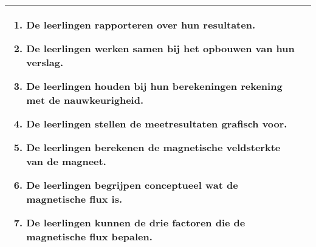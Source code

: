 \begin{landscape}
\begin{tabularx}{1.56\textwidth}{|p{}|X|}
\begin{enumerate}[itemsep=0.08\baselineskip]
			\item De leerlingen rapporteren over hun resultaten.
			\item De leerlingen werken samen bij het opbouwen van hun verslag.
			\item De leerlingen houden bij hun berekeningen rekening met de nauwkeurigheid.
			\item De leerlingen stellen de meetresultaten grafisch voor.
			\item De leerlingen berekenen de magnetische veldsterkte van de magneet.
			\item De leerlingen begrijpen conceptueel wat de magnetische flux is.
			\item De leerlingen kunnen de drie factoren die de magnetische flux bepalen.
		\end{enumerate} \\\hline
	\end{tabularx}



\end{landscape}
